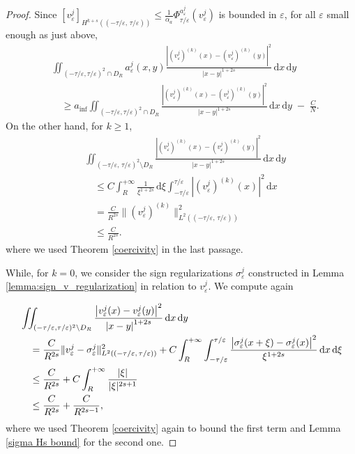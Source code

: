 \documentclass{article}
\theoremstyle{definition}
\newcommand{\abs}[1]{\left|#1\right|}
\newcommand{\de}{\mathrm{d}}
\newcommand{\e}{\varepsilon}
\def\e{\varepsilon}
\begin{document}
\begin{proof}
    Since $[v^j_\e]_{H^{k+s}((-\tau/\e,\,\tau/\e))}\leq \frac{1}{\alpha_a}\Phi^{a^{j}_{\scriptstyle\e}}_{\tau/ \e}(v_\e^j)$ is bounded in $\e$, for all $\e$ small enough as just above,
    \begin{align}
        \nonumber &\iint_{(-{\tau}/{\e},{\tau}/{\e})^2\cap D_R} a^j_\e(x,y)\frac{\abs{(v_\e^j)^{(k)}(x) - (v_\e^j)^{(k)}(y)}^2}{\abs{x-y}^{1+2s}}\, \de x\,\de y\\
        &\quad \label{stima vicino}
        \geq a_{\inf}\iint_{(-{\tau}/{\e},{\tau}/{\e})^2\cap D_R}  \frac{\abs{(v_\e^j)^{(k)}(x) - (v_\e^j)^{(k)}(y)}^2}{\abs{x-y}^{1+2s}}\, \de x\,\de y \;- \;\frac{C}{N}.
    \end{align}
    On the other hand, {for $k\geq 1$,} 
\begin{equation}
    \begin{split}\label{eq:stima_lontano_k1}
          &\iint_{(-{\tau}/{\e},\,{\tau}/{\e})^2\setminus D_R} \frac{\abs{(v_\e^j)^{(k)}(x) - (v_\e^j)^{(k)}(y)}^2}{\abs{x-y}^{1+2s}}\, \de x\,\de y  \\
        &\quad \leq C \int_R^{+\infty}\frac{1}{\xi^{1+2s}}\,\de \xi \int_{-\tau/\e}^{\tau/\e}\abs{(v_\e^j)^{(k)}(x)}^2\,\de x \\
        &\quad = \frac{C}{R^{2s}}\|(v_\e^j)^{(k)}\|^2_{L^2((-\tau/\e,\,\tau/\e))}\\
        &\quad \leq \frac{C}{R^{2s}}.
    \end{split}
\end{equation}
    where we used Theorem \ref{coercivity} in the last passage.
    
    {While, for $k=0$, we consider the sign regularizations $\sigma^j_\e$ constructed in Lemma \ref{lemma:sign_v_regularization} in relation to $v^j_\e$. We compute again

    \begin{align}
         \notag&\iint_{(-{\tau}/{\e},{\tau}/{\e})^2\setminus D_R} \frac{\abs{v_\e^j(x) - v_\e^j(y)}^2}{\abs{x-y}^{1+2s}}\, \de x\,\de y  \\
        \notag&\quad = \frac{C}{R^{2s}}\|{v_\e^j-\sigma_\e^j}\|^2_{L^2((-\tau/\e,\,\tau/\e ))}  + C\int_R^{+\infty}\int_{-\tau/\e}^{\tau/\e} \frac{\abs{\sigma_\e^j(x+\xi) - \sigma_\e^j(x)}^2}{\xi^{1+2s}}\, \de x\,\de \xi\\
        \notag&\quad \leq  \frac{C}{R^{2s}}+C\int_R^{+\infty} \frac{|\xi|}{|\xi|^{2s+1}}\\
        \label{eq:stima_lontano_k0}&\quad \leq \frac{C}{R^{2s}}+\frac{C}{R^{2s-1}},
    \end{align}
    where we used Theorem \ref{coercivity} again to bound the first term and Lemma \ref{sigma Hs bound} for the second one.
    } 
    

\end{proof}
\end{document}
